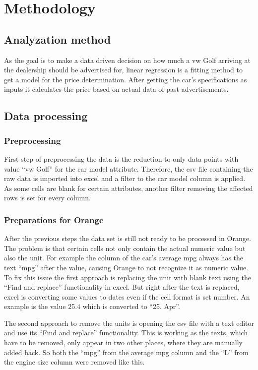 \chapter{Methodology}
\section{Analyzation method}
As the goal is to make a data driven decision on how much a \ac{vw} Golf arriving at the dealership should be advertised for, linear regression is a fitting method to
get a model for the price determination. After getting the car's specifications as inputs it calculates the price based on actual data of past advertisements.

\section{Data processing}
\subsection{Preprocessing}
First step of preprocessing the data is the reduction to only data points with value \enquote{\ac{vw} Golf} for the car model attribute. Therefore, the \ac{csv} file containing the raw data is
imported into \ac{excel} and a filter to the car model column is applied. As some cells are blank for certain attributes, another filter removing the affected rows is set for every column. 

\subsection{Preparations for Orange}
After the previous steps the data set is still not ready to be processed in Orange. The problem is that certain cells not only contain the actual numeric value but also the 
unit. For example the column of the car's average \ac{mpg} always has the text \enquote{mpg} after the value, causing Orange to not recognize it as 
numeric value. To fix this issue the first approach is replacing the unit with blank text using the \enquote{Find and replace} functionality in \ac{excel}. But right after
the text is replaced, \ac{excel} is converting some values to dates even if the cell format is set number. An example is the value 25.4 which is converted to
\enquote{25. Apr}.
\par
The second approach to remove the units is opening the \ac{csv} file with a text editor and use its \enquote{Find and replace} functionality. This is working as the texts,
which have to be removed, only appear in two other places, where they are manually added back. So both the \enquote{mpg} from the average \ac{mpg} column and the \enquote{L}
from the engine size column were removed like this.

